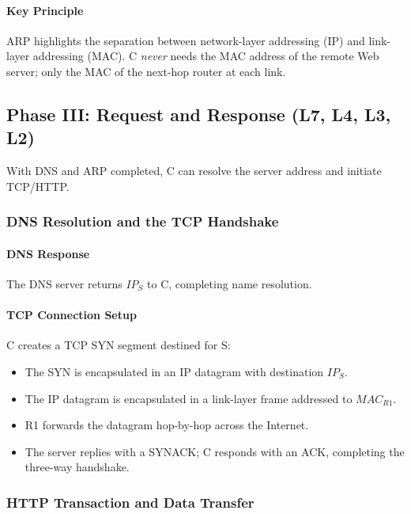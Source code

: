 \documentclass[12pt]{article}
\begin{document}
\paragraph{Key Principle}
ARP highlights the separation between network-layer addressing (IP) and link-layer addressing (MAC). C \emph{never} needs the MAC address of the remote Web server; only the MAC of the next-hop router at each link.

\subsection{Phase III: Request and Response (L7, L4, L3, L2)}

With DNS and ARP completed, C can resolve the server address and initiate TCP/HTTP.

\subsubsection{DNS Resolution and the TCP Handshake}

\paragraph{DNS Response}
The DNS server returns $IP_S$ to C, completing name resolution.

\paragraph{TCP Connection Setup}
C creates a TCP SYN segment destined for S:
\begin{itemize}
    \item The SYN is encapsulated in an IP datagram with destination $IP_S$.
    \item The IP datagram is encapsulated in a link-layer frame addressed to $MAC_{R1}$.
    \item R1 forwards the datagram hop-by-hop across the Internet.
    \item The server replies with a SYNACK; C responds with an ACK, completing the three-way handshake.
\end{itemize}

\subsubsection{HTTP Transaction and Data Transfer}
\end{document}
